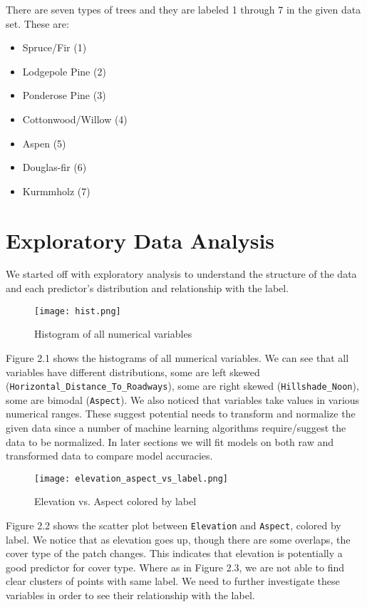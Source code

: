 \documentclass[11pt]{article}
\begin{document}
\noindent There are seven types of trees and they are labeled 1 through 7 in the given data set. These are:
\begin{itemize}
\setlength\itemsep{0cm}
\item Spruce/Fir (1)
\item Lodgepole Pine (2)
\item Ponderose Pine (3)
\item Cottonwood/Willow (4)
\item Aspen (5)
\item Douglas-fir (6)
\item Kurmmholz (7)
\end{itemize}

\newpage

\section{Exploratory Data Analysis}
We started off with exploratory analysis to understand the structure of the data and each predictor's distribution and relationship with the label.

\begin{figure}[h]
\label{eda1}
\begin{center}
\texttt{[image: hist.png]}
\end{center}
\caption{Histogram of all numerical variables}
\end{figure}

\noindent Figure 2.1 shows the histograms of all numerical variables. We can see that all variables have different distributions, some are left skewed (\texttt{Horizontal\_Distance\_To\_Roadways}), some are right skewed (\texttt{Hillshade\_Noon}), some are bimodal (\texttt{Aspect}). We also noticed that variables take values in various numerical ranges. These suggest potential needs to transform and normalize the given data since a number of machine learning algorithms require/suggest the data to be normalized. In later sections we will fit models on both raw and transformed data to compare model accuracies.

\begin{figure}[h] 
\label{eda2}
\begin{center}
\texttt{[image: elevation\_aspect\_vs\_label.png]}
\end{center}
\caption{Elevation vs. Aspect colored by label}
\end{figure}

\noindent Figure 2.2 shows the scatter plot between \texttt{Elevation} and \texttt{Aspect}, colored by label. We notice that as elevation goes up, though there are some overlaps, the cover type of the patch changes. This indicates that elevation is potentially a good predictor for cover type. Where as in Figure 2.3, we are not able to find clear clusters of points with same label. We need to further investigate these variables in order to see their relationship with the label.
\end{document}
